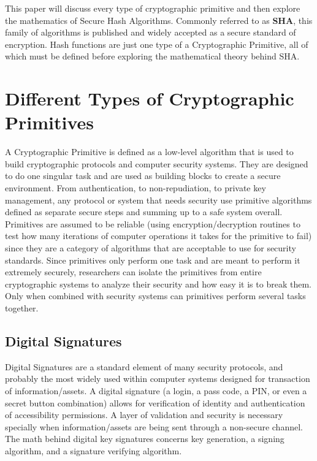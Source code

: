 \documentclass[12pt]{extarticle}
\begin{document}
This paper will discuss every type of cryptographic primitive and then explore the mathematics of Secure Hash Algorithms. Commonly referred to as {\textbf{SHA}}, this family of algorithms is published and widely accepted as a secure standard of encryption. Hash functions are just one type of a Cryptographic Primitive, all of which must be defined before exploring the mathematical theory behind SHA.
\section{Different Types of Cryptographic Primitives}

A Cryptographic Primitive is defined as a low-level algorithm that is used to build cryptographic protocols and computer security systems. They are designed to do one singular task and are used as building blocks to create a secure environment. From authentication, to non-repudiation, to private key management, any protocol or system that needs security use primitive algorithms defined as separate secure steps and summing up to a safe system overall. Primitives are assumed to be reliable (using encryption/decryption routines to test how many iterations of computer operations it takes for the primitive to fail) since they are a category of algorithms that are acceptable to use for security standards. Since primitives only perform one task and are meant to perform it extremely securely, researchers can isolate the primitives from entire cryptographic systems to analyze their security and how easy it is to break them. Only when combined with security systems can primitives perform several tasks together.\cite{src7}

\subsection{Digital Signatures}
Digital Signatures are a standard element of many security protocols, and probably the most widely used within computer systems designed for transaction of information/assets. A digital signature (a login, a pass code, a PIN, or even a secret button combination) allows for verification of identity and authentication of accessibility permissions. A layer of validation and security is necessary specially when information/assets are being sent through a non-secure channel.\cite{src7}\cite{src9}\\
The math behind digital key signatures concerns key generation, a signing algorithm, and a signature verifying algorithm.
\end{document}
